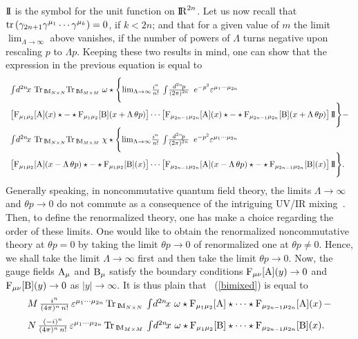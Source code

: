 \documentclass[a4paper,12pt]{article}
\def\A{{\rm A}}
\def\B{{\rm B}}
\def\F{{\rm F}}
\def\idpn{\int\! \frac{d^{2n}\!p}{(2\pi)^{2n}} \,\,}
\def\idxn{\int\! d^{2n}\!x \,}
\def\RR{{\rm I\!\!\, R}}
\def\MM{{\rm I\!\!\, M}}
\def\unit{{\rm I\!\!\, I}}
\begin{document}
$\unit$ is the symbol for the unit function on $\RR^{2n}$. Let us now recall that
${\rm tr}\,(\gamma_{2n+1}\gamma^{\mu_1}\cdots \gamma^{\mu_k})=0$, if 
$k<2n$; and that for a given value of $m$ the limit 
${\lim}_{\Lambda\rightarrow\infty}$ above vanishes, if the number of powers 
of $\Lambda$ turns negative upon  rescaling $p$ to $\Lambda p$. Keeping these 
two results in mind, one can show that 
the expression in the previous equation is equal to
\begin{equation}
\begin{array}{l}
{\idxn\,{\rm Tr}_{\,\MM_{N\times N}}{\rm Tr}_{\,\MM_{M\times M}} \;
\omega\star\Bigg\{
\mbox{lim}_{\Lambda\rightarrow\infty}\frac{i^n}{n!} 
\,\idpn\,e^{-p^2}\varepsilon^{\mu_1\cdots\mu_{2n}}}\\[9pt]
{\big[{\rm F}_{\mu_1\mu_2}[\A](x)\star - 
\star{\rm F}_{\mu_1\mu_2}[\B](x+\Lambda\,\theta p)\big]
\cdots\big[{\rm F}_{\mu_{2n-1}\mu_{2n}}[\A](x)\star - 
\star{\rm F}_{\mu_{2n-1}\mu_{2n}}[\B](x+\Lambda\,\theta p)\big]\,\unit\Bigg\}
-}\\[9pt]
{\idxn\,{\rm Tr}_{\,\MM_{N\times N}}{\rm Tr}_{\,\MM_{M\times M}} \;
\chi\star\Bigg\{ 
\mbox{lim}_{\Lambda\rightarrow\infty}\frac{i^n}{n!} 
\,\idpn\,e^{-p^2}\varepsilon^{\mu_1\cdots\mu_{2n}}}\\[9pt]
{\big[{\rm F}_{\mu_1\mu_2}[\A](x-\Lambda\,\theta p)\star - 
\star{\rm F}_{\mu_1\mu_2}[\B](x)\big]\cdots
\big[{\rm F}_{\mu_{2n-1}\mu_{2n}}[\A](x-\Lambda\,\theta p)\star - 
\star{\rm F}_{\mu_{2n-1}\mu_{2n}}[\B](x)\big]\,\unit\Bigg\}.}\\[9pt]
\end{array}
\label{bimixed}
\end{equation}
Generally speaking, in noncommutative quantum field theory, the 
limits $\Lambda\rightarrow\infty$ and $\theta p\rightarrow 0$ do not 
commute as a consequence of the intriguing 
UV/IR mixing~\cite{Minwalla:2000px}. 
Then, to define the renormalized theory, one  has make a choice regarding 
the order of these limits. One would like to obtain the renormalized 
noncommutative theory at $\theta p = 0$ by taking the limit $\theta p\rightarrow 0$ of renormalized one at $\theta p \neq 0$. Hence, we shall take  
the limit $\Lambda\rightarrow\infty$ first and then take 
the limit $\theta p\rightarrow 0$. Now, the gauge fields $\A_{\mu}$ and 
$\B_{\mu}$ satisfy the boundary conditions $\F_{\mu\nu}[\A](y)\rightarrow 0$ 
and $\F_{\mu\nu}[\B](y)\rightarrow 0$ as $|y|\rightarrow \infty$. It is thus 
plain  that ~(\ref{bimixed}) is equal to
\begin{equation}
\begin{array}{l}
{M\,\frac{i^n}{(4\pi)^n\,n!}\,\varepsilon^{\mu_1\cdots\mu_{2n}}\,
{\rm Tr}_{\,\MM_{N\times N}}\,\idxn\,\omega\star
\F_{\mu_1\mu_2}[\A]\star\cdots\star\F_{\mu_{2n-1}\mu_{2n}}[\A](x)\,-}\\[9pt]
{N\,\frac{(-i)^n}{(4\pi)^n\,n!}\,\varepsilon^{\mu_1\cdots\mu_{2n}}\,{\rm Tr}_{\,\MM_{M\times M}}\,\idxn\,\omega\star
\F_{\mu_1\mu_2}[\B]\star\cdots\star\F_{\mu_{2n-1}\mu_{2n}}[\B](x).}\\[9pt]
\end{array}
\label{bicompu}
\end{equation}
\end{document}
